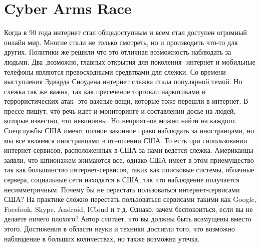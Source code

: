 \documentclass[12pt,]{article}
\begin{document}
\section{Cyber Arms Race}
Когда в 90 года интернет стал общедоступным и всем стал доступен огромный онлайн мир. Многие стали не только смотреть, но и производить что-то для других. Политики же решили что это отличная возможность наблюдать за людьми. Два ,возможно, главных открытия для поколения- интернет и мобильные телефоны являются превосходными средвтвами для слежки. Со времени выступления Эдварда Сноудена интернет слежка стала популярной темой. Но слежка так же важна, так как пресечение торговли наркотиками и террористических атак- это важные вещи, которые тоже перешли в интернет. В прессе пишут, что речь идет и мониторинге и составлении досье на людей, которые известно, что невиновны. Но неприятное можно найти на каждого. Спецслужбы США имеют полное законное право наблюдать за иностранцами, но мы все являемся иностранцами в отношении США. То есть при сипользовании интернет-сервисов, расположенных в США за нами ведется слежка. Американцы заявли, что шпионажем знимаются все, однако США имеет в этом приемущество так как большинство интернет-сервисов, таких как поисковые системы, облачные сервера, социальные сети находятся в США, так что наблюдение получается несимметричным. Почему бы не перестать пользоваться интернет-сервисами США? На практике сложно перестать пользоваться сервисами такими как Google, Facefook, Skype, Android, ICloud и т д. Однако, зачем беспокоиться, если вы не делаете ничего плохого? Автор считает, что вы должны быть возмущены вместо этого. Достижения в области науки и техники достигли того, что возможно наблюдение в больших количествах, но также возможна утечка.
\end{document}
